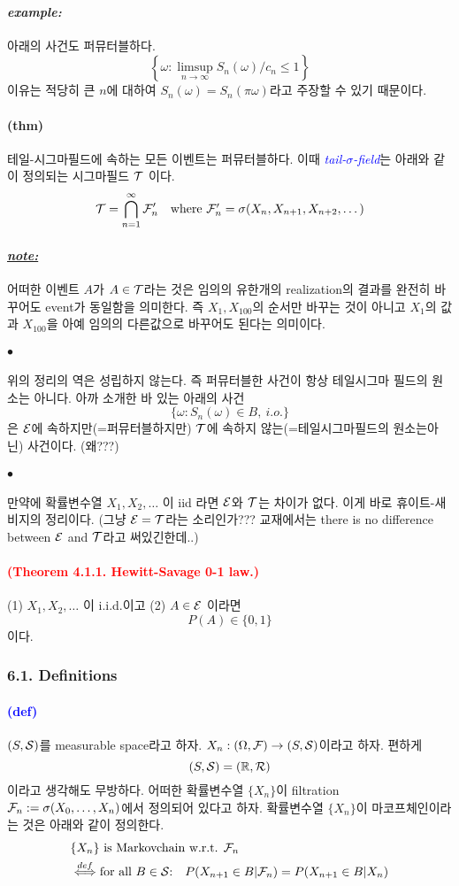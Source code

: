 \documentclass[12pt,oneside,english]{book}
\def\ck{\paragraph{\Large$\bullet$}\Large}
\def\note{\paragraph{\Large\textit{\underline{note:}}}\Large}
\def\ex{\paragraph{\Large\textit{example:}}\Large}
\newcommand{\para}[1]{\paragraph{\Large(#1)}\Large}
\newcommand{\parablue}[1]{\paragraph{\Large\textcolor{blue}{(#1)}}\Large}
\newcommand{\parared}[1]{\paragraph{\Large\textcolor{red}{(#1)}}\Large}
\begin{document}
\ex 아래의 사건도 퍼뮤터블하다. 
\[
\left\{\omega:\limsup_{n\to\infty}S_n(\omega)/c_n \leq 1\right\}
\]
이유는 적당히 큰 $n$에 대하여 $S_n(\omega)=S_n(\pi\omega)$라고 주장할 수 있기 때문이다.

\para{thm} 테일-시그마필드에 속하는 모든 이벤트는 퍼뮤터블하다. 이때 \textcolor{blue}{\emph{tail-$\sigma$-field}}는 아래와 같이 정의되는 시그마필드 ${\cal T}$ 이다. 
\[
{\cal T}=\bigcap_{n=1}^{\infty}{\cal F}'_n \quad \mbox{where ${\cal F}'_n=\sigma(X_n,X_{n+1},X_{n+2},\dots)$}
\]

\note 어떠한 이벤트 $A$가 $A\in{\cal T}$라는 것은 임의의 유한개의 realization의 결과를 완전히 바꾸어도 event가 동일함을 의미한다. 즉 $X_1,X_{100}$의 순서만 바꾸는 것이 아니고 $X_1$의 값과 $X_{100}$을 아예 임의의 다른값으로 바꾸어도 된다는 의미이다. 

\ck 위의 정리의 역은 성립하지 않는다. 즉 퍼뮤터블한 사건이 항상 테일시그마 필드의 원소는 아니다. 아까 소개한 바 있는 아래의 사건
\[
\{\omega:S_n(\omega) \in B, ~i.o.\}
\]
은 ${\cal E}$에 속하지만(=퍼뮤터블하지만) ${\cal T}$에 속하지 않는(=테일시그마필드의 원소는아닌) 사건이다. (왜???)

\ck 만약에 확률변수열 $X_1,X_2,\dots$ 이 iid 라면 ${\cal E}$와 ${\cal T}$는 차이가 없다. 이게 바로 휴이트-새비지의 정리이다. (그냥 ${\cal E}={\cal T}$라는 소리인가??? 교재에서는 there is no difference between ${\cal E}$ and ${\cal T}$라고 써있긴한데..)

\parared{Theorem 4.1.1. Hewitt-Savage 0-1 law.} 
(1) $X_1,X_2,\dots$ 이 i.i.d.이고 (2) $A \in {\cal E}$ 이라면 
\[
P(A) \in \{0,1\}
\]
이다. 



\subsubsection{6.1. Definitions}
\parablue{def} $(S,{\cal S})$를 measurable space라고 하자. $X_n:(\Omega,{\cal F}) \to (S,{\cal S})$이라고 하자. 편하게 
\[
(S,{\cal S})=(\mathbb{R},{\cal R})
\]
이라고 생각해도 무방하다. 어떠한 확률변수열 $\{X_n\}$이 filtration ${\cal F}_n:=\sigma(X_0,\dots,X_n)$에서 정의되어 있다고 하자. 확률변수열 $\{X_n\}$이 마코프체인이라는 것은 아래와 같이 정의한다. 
\begin{align*}
& \{X_n\} \mbox{ is Markovchain w.r.t. } {\cal F}_n \\
& \overset{def}{\Longleftrightarrow} \mbox{for all $B\in {\cal S}$:}\quad 
P(X_{n+1}\in B | {\cal F}_n)=P(X_{n+1}\in B | X_n)
\end{align*}
\end{document}

